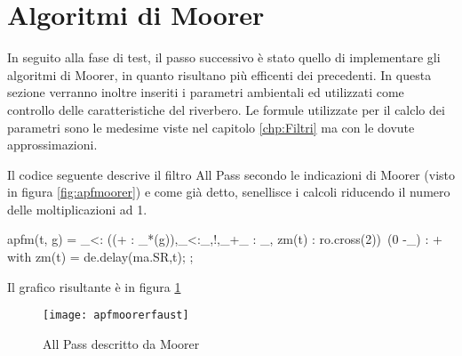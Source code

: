 \section{Algoritmi di Moorer}

In seguito alla fase di test, il passo successivo è stato quello di implementare gli algoritmi di Moorer, in quanto risultano più efficenti dei precedenti.
In questa sezione verranno inoltre inseriti i parametri ambientali ed utilizzati come controllo delle caratteristiche del riverbero. Le formule utilizzate per il calclo dei parametri sono le medesime viste nel capitolo \ref{chp:Filtri} ma con le dovute approssimazioni.

\bigskip

Il codice seguente descrive il filtro All Pass secondo le indicazioni di Moorer (visto in figura \ref{fig:apfmoorer}) e come già detto, senellisce i calcoli riducendo il numero delle moltiplicazioni ad 1.

\begin{code}
apfm(t, g) = _<: ((+ : _*(g)),_<:_,!,_+_ : _, zm(t) : ro.cross(2))~(0 -_) : +
with{
    zm(t) = de.delay(ma.SR,t);
};
\end{code}

\bigskip

Il grafico risultante è in figura \ref{fig:apfmoorerfaust}

\begin{figure}[htp]
\centering
\texttt{[image: apfmoorerfaust]}
\caption{All Pass descritto da Moorer}
\label{fig:apfmoorerfaust}
\end{figure}

